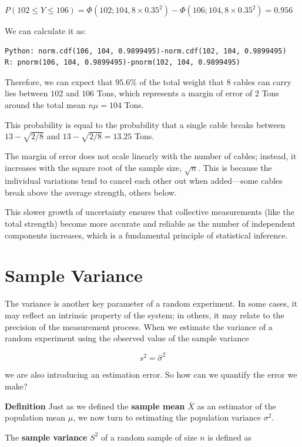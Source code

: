 \documentclass[
]{book}
\begin{document}
\(P(102 \leq Y \leq 106)=\Phi(102; 104, 8\times 0.35^2)-\Phi(106; 104, 8\times 0.35^2)=0.956\)

We can calculate it as:

\begin{verbatim}
Python: norm.cdf(106, 104, 0.9899495)-norm.cdf(102, 104, 0.9899495)
R: pnorm(106, 104, 0.9899495)-pnorm(102, 104, 0.9899495)
\end{verbatim}

Therefore, we can expect that \(95.6\%\) of the total weight that 8 cables can carry lies between \(102\) and \(106\) Tons, which represents a margin of error of \(2\) Tons around the total mean \(n\mu = 104\) Tons.

This probability is equal to the probability that a single cable breaks between \(13-\sqrt{2/8}\) and \(13-\sqrt{2/8}=13.25\) Tons.

The margin of error does not scale linearly with the number of cables; instead, it increases with the square root of the sample size, \(\sqrt{n}\). This is because the individual variations tend to cancel each other out when added---some cables break above the average strength, others below.

This slower growth of uncertainty ensures that collective measurements (like the total strength) become more accurate and reliable as the number of independent components increases, which is a fundamental principle of statistical inference.

\hypertarget{sample-variance-1}{%
\section{Sample Variance}\label{sample-variance-1}}

The variance is another key parameter of a random experiment. In some cases, it may reflect an intrinsic property of the system; in others, it may relate to the precision of the measurement process. When we estimate the variance of a random experiment using the observed value of the sample variance

\[
s^2 = \hat{\sigma}^2
\]

we are also introducing an estimation error. So how can we quantify the error we make?

\textbf{Definition}
Just as we defined the \textbf{sample mean} \(\bar{X}\) as an estimator of the population mean \(\mu\), we now turn to estimating the population variance \(\sigma^2\).

The \textbf{sample variance} \(S^2\) of a random sample of size \(n\) is defined as
\end{document}
